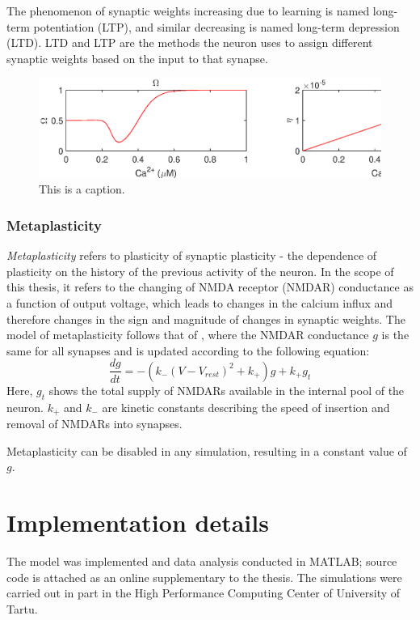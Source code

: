 \documentclass[a4paper,12pt]{report}
\theoremstyle{definition}
\begin{document}
The phenomenon of synaptic weights increasing due to learning is named long-term potentiation (LTP), and similar decreasing is named long-term depression (LTD). LTD and LTP are the methods the neuron uses to assign different synaptic weights based on the input to that synapse.

\begin{figure}[h]
    \includegraphics[width=\textwidth]{figures/methods_eta_omega.eps}
    \caption{This is a caption.}
    \label{fig:methods_eta_omega}
\end{figure}


\subsubsection{Metaplasticity}
\emph{Metaplasticity} refers to plasticity of synaptic plasticity - the dependence of plasticity on the history of the previous activity of the neuron. In the scope of this thesis, it refers to the changing of NMDA receptor (NMDAR) conductance as a function of output voltage, which leads to changes in the calcium influx and therefore changes in the sign and magnitude of changes in synaptic weights. The model of metaplasticity follows that of \cite{yeung2004synaptic}, where the NMDAR conductance $g$ is the same for all synapses and is updated according to the following equation: $$ \frac{dg}{dt}=-(k_- (V-V_{rest})^2 + k_+)g + k_+ g_t $$
Here, $g_t$ shows the total supply of NMDARs available in the internal pool of the neuron. $k_+$ and $k_-$ are kinetic constants describing the speed of insertion and removal of NMDARs into synapses.

Metaplasticity can be disabled in any simulation, resulting in a constant value of $g$.





\section{Implementation details}

The model was implemented and data analysis conducted in MATLAB; source code is attached as an online supplementary to the thesis. The simulations were carried out in part in the High Performance Computing Center of University of Tartu.
\end{document}
